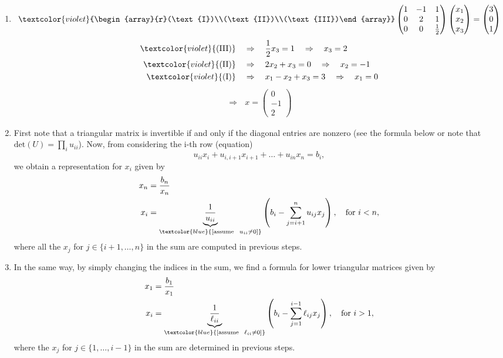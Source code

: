 {
\color{solution}
\begin{enumerate}
	\item  
	\begin{align*}
	\textcolor{violet}{\begin{array}{r}(\text{I})\\(\text{II})\\(\text{III})\end{array}}
	\begin{pmatrix}1&-1&1\\0&2&1\\0&0&\frac{1}{2}\end{pmatrix}\begin{pmatrix}x_1\\x_2\\x_3\end{pmatrix}=\begin{pmatrix}3\\0\\1\end{pmatrix}
	\end{align*}
	\begin{align*}
	\textcolor{violet}{(\text{III})}~~~&\Rightarrow~~~ \frac{1}{2}x_3=1~~~\Rightarrow~~~ x_3=2\\
	\textcolor{violet}{(\text{II})}~~~&\Rightarrow~~~2x_2+x_3 = 0~~~\Rightarrow~~~ x_2 = -1\\
	\textcolor{violet}{(\text{I})}~~~&\Rightarrow~~~x_1 -x_2+x_3 = 3~~~\Rightarrow~~~ x_1 = 0
	\end{align*}
	\begin{align*}
	\Rightarrow\ \ \ x=\begin{pmatrix}0\\-1\\2\end{pmatrix}
	\end{align*}
	\item First note that a triangular matrix is invertible if and only if the diagonal entries are nonzero (see the formula below or note that $\text{det}(U)=\prod_i u_{ii}$). 
	Now, from considering the i-th row (equation)
	$$
	u_{ii}x_i + u_{i,i+1}x_{i+1}+\dots+u_{in}x_n = b_i,
	$$
	we obtain a representation for $x_i$ given by
	\begin{align*}
	x_n &= \frac{b_n}{x_n}\\
	 x_i &= \underbrace{\frac{1}{u_{ii}}}_{\textcolor{blue}{[\text{assume}~~ u_{ii}\neq 0 ]}}\left(b_i-\sum_{j=i+1}^{n}u_{ij}x_j\right), ~~~\text{for}~ i<n,
	\end{align*}
	where all the $x_j$ for $ j\in\{i+1,\dots,n\}$ in the sum are computed in previous steps.	
	\item In the same way, by simply changing the indices in the sum, we find a formula for lower triangular matrices given by 
\begin{align*}
x_1 &= \frac{b_1}{x_1}\\
x_i &=
  \underbrace{\frac{1}{\ell_{ii}}}_{\textcolor{blue}{[\text{assume}~~ \ell_{ii}\neq 0 ]}}\left(b_i-\sum_{j=1}^{i-1}\ell_{ij}x_j\right),~~~\text{for}~ i>1,\\
\end{align*}
	where the $x_j$ for $j \in \{1,\ldots, i-1\}$ in the sum are determined in previous steps.
\end{enumerate}
}